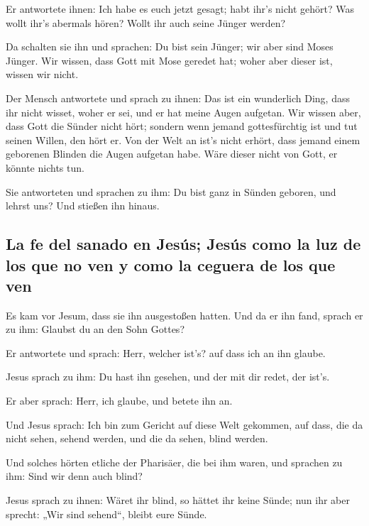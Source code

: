  Er antwortete ihnen: Ich habe es euch jetzt gesagt; habt
ihr's nicht gehört? Was wollt ihr's abermals hören? Wollt ihr auch seine
Jünger werden?

 Da schalten sie ihn und sprachen: Du bist sein Jünger;
wir aber sind Moses Jünger.  Wir wissen, dass Gott mit
Mose geredet hat; woher aber dieser ist, wissen wir nicht.

 Der Mensch antwortete und sprach zu ihnen: Das ist ein
wunderlich Ding, dass ihr nicht wisset, woher er sei, und er hat meine
Augen aufgetan.  Wir wissen aber, dass Gott die Sünder
nicht hört; sondern wenn jemand gottesfürchtig ist und tut seinen
Willen, den hört er.  Von der Welt an ist's nicht erhört,
dass jemand einem geborenen Blinden die Augen aufgetan habe.
 Wäre dieser nicht von Gott, er könnte nichts tun.

 Sie antworteten und sprachen zu ihm: Du bist ganz in
Sünden geboren, und lehrst uns? Und stießen ihn hinaus.

\hypertarget{la-fe-del-sanado-en-jesuxfas-jesuxfas-como-la-luz-de-los-que-no-ven-y-como-la-ceguera-de-los-que-ven}{%
\subsection{La fe del sanado en Jesús; Jesús como la luz de los que no
ven y como la ceguera de los que
ven}\label{la-fe-del-sanado-en-jesuxfas-jesuxfas-como-la-luz-de-los-que-no-ven-y-como-la-ceguera-de-los-que-ven}}

 Es kam vor Jesum, dass sie ihn ausgestoßen hatten. Und
da er ihn fand, sprach er zu ihm: Glaubst du an den Sohn Gottes?

 Er antwortete und sprach: Herr, welcher ist's? auf dass
ich an ihn glaube.

 Jesus sprach zu ihm: Du hast ihn gesehen, und der mit
dir redet, der ist's.

 Er aber sprach: Herr, ich glaube, und betete ihn an.

 Und Jesus sprach: Ich bin zum Gericht auf diese Welt
gekommen, auf dass, die da nicht sehen, sehend werden, und die da sehen,
blind werden.

 Und solches hörten etliche der Pharisäer, die bei ihm
waren, und sprachen zu ihm: Sind wir denn auch blind?

 Jesus sprach zu ihnen: Wäret ihr blind, so hättet ihr
keine Sünde; nun ihr aber sprecht: „Wir sind sehend``, bleibt eure
Sünde.

